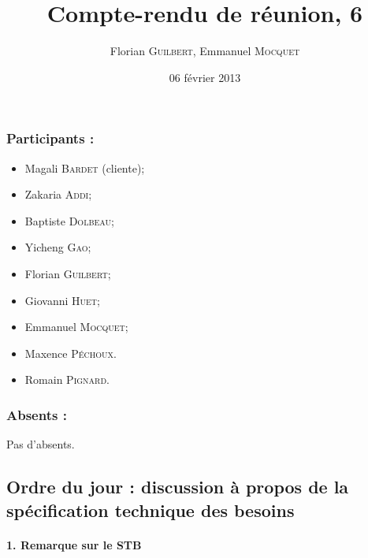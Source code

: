 \documentclass[a4paper,10pt]{article}
\author{Florian \textsc{Guilbert}, Emmanuel \textsc{Mocquet}}
\title{Compte-rendu de réunion, 6}
\date{06 février 2013}
\begin{document}
\maketitle

\subsubsection*{Participants : }
\begin{itemize}
    \item Magali \textsc{Bardet} (cliente);
    \item Zakaria \textsc{Addi};
    \item Baptiste \textsc{Dolbeau};
    \item Yicheng \textsc{Gao};
    \item Florian \textsc{Guilbert};
    \item Giovanni \textsc{Huet};
    \item Emmanuel \textsc{Mocquet};
    \item Maxence  \textsc{Péchoux}.
    \item Romain \textsc{Pignard}.
\end{itemize}

\subsubsection*{Absents : }
Pas d'absents.

\subsection*{Ordre du jour : discussion à propos de la spécification
technique des besoins}

\paragraph{1. Remarque sur le STB}
\end{document}
